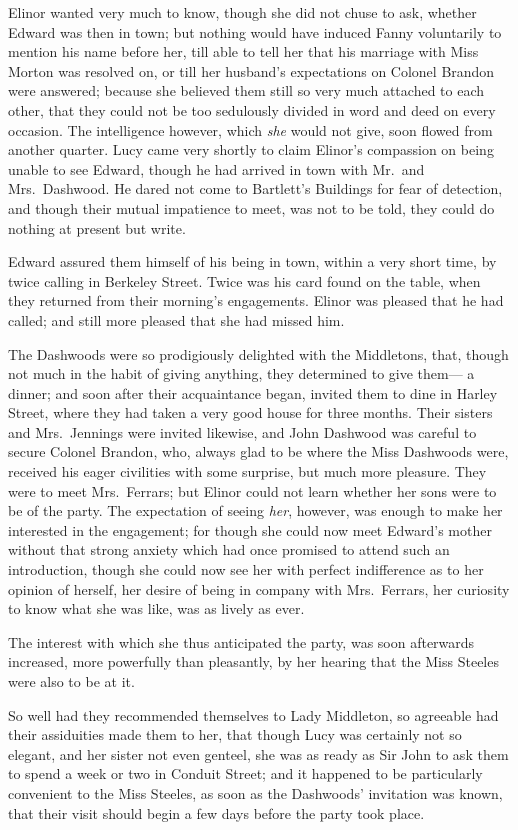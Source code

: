 \documentclass{article}
\begin{document}
Elinor wanted very much to know, though she did
not chuse to ask, whether Edward was then in town;
but nothing would have induced Fanny voluntarily
to mention his name before her, till able to tell her
that his marriage with Miss Morton was resolved on,
or till her husband's expectations on Colonel Brandon
were answered; because she believed them still so very
much attached to each other, that they could not be too
sedulously divided in word and deed on every occasion.
The intelligence however, which \emph{she} would not give,
soon flowed from another quarter.  Lucy came very shortly
to claim Elinor's compassion on being unable to see Edward,
though he had arrived in town with Mr.\ and Mrs.\ Dashwood.
He dared not come to Bartlett's Buildings for fear
of detection, and though their mutual impatience to meet,
was not to be told, they could do nothing at present
but write.

Edward assured them himself of his being in town,
within a very short time, by twice calling in Berkeley Street.
Twice was his card found on the table, when they returned
from their morning's engagements.  Elinor was pleased
that he had called; and still more pleased that she had
missed him.

The Dashwoods were so prodigiously delighted
with the Middletons, that, though not much in the habit
of giving anything, they determined to give them---%
a dinner; and soon after their acquaintance began,
invited them to dine in Harley Street, where they had
taken a very good house for three months.  Their sisters
and Mrs.\ Jennings were invited likewise, and John Dashwood
was careful to secure Colonel Brandon, who, always glad
to be where the Miss Dashwoods were, received his eager
civilities with some surprise, but much more pleasure.
They were to meet Mrs.\ Ferrars; but Elinor could not learn
whether her sons were to be of the party.  The expectation
of seeing \emph{her}, however, was enough to make her interested
in the engagement; for though she could now meet Edward's
mother without that strong anxiety which had once promised
to attend such an introduction, though she could now see
her with perfect indifference as to her opinion of herself,
her desire of being in company with Mrs.\ Ferrars,
her curiosity to know what she was like, was as lively as ever.

The interest with which she thus anticipated the
party, was soon afterwards increased, more powerfully
than pleasantly, by her hearing that the Miss Steeles
were also to be at it.

So well had they recommended themselves to Lady Middleton,
so agreeable had their assiduities made them to her,
that though Lucy was certainly not so elegant, and her
sister not even genteel, she was as ready as Sir John
to ask them to spend a week or two in Conduit Street;
and it happened to be particularly convenient to the Miss
Steeles, as soon as the Dashwoods' invitation was known,
that their visit should begin a few days before the party
took place.
\end{document}
